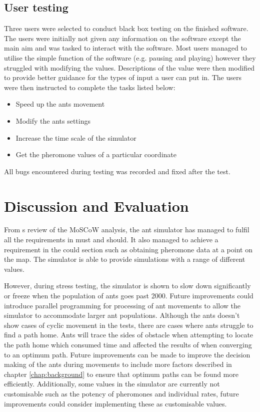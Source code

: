 \documentclass[a4paper, oneside, 11pt]{report}
\begin{document}
\section{User testing}
Three users were selected to conduct black box testing on the finished software. The users were initially not given any information on the software except the main aim and was tasked to interact with the software. Most users managed to utilise the simple function of the software (e.g. pausing and playing) however they struggled with modifying the values. Descriptions of the value were then modified to provide better guidance for the types of input a user can put in. The users were then instructed to complete the tasks listed below:
\begin{itemize}
	\item Speed up the ants movement
	\item Modify the ants settings
	\item Increase the time scale of the simulator
	\item Get the pheromone values of a particular coordinate
\end{itemize} 
All bugs encountered during testing was recorded and fixed after the test.

\chapter{Discussion and Evaluation}
\label{chap:discussion}

From s review of the MoSCoW analysis, the ant simulator has managed to fulfil all the requirements in must and should. It also managed to achieve a requirement in the could section such as obtaining pheromone data at a point on the map. The simulator is able to provide simulations with a range of different values. 

However, during stress testing, the simulator is shown to slow down significantly or freeze when the population of ants goes past 2000. Future improvements could introduce parallel programming for processing of ant movements to allow the simulator to accommodate larger ant populations. Although the ants doesn't show cases of cyclic movement in the tests, there are cases where ants struggle to find a path home. Ants will trace the sides of obstacle when attempting to locate the path home which consumed time and affected the results of when converging to an optimum path. Future improvements can be made to improve the decision making of the ants during movements to include more factors described in chapter \ref{chap:background} to ensure that optimum paths can be found more efficiently. Additionally, some values in the simulator are currently not customisable such as the potency of pheromones and individual rates, future improvements could consider implementing these as customisable values.
\end{document}
